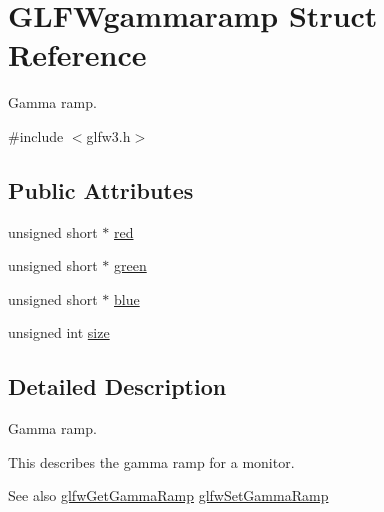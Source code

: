 \hypertarget{structGLFWgammaramp}{\section{\-G\-L\-F\-Wgammaramp \-Struct \-Reference}
\label{structGLFWgammaramp}
}


\-Gamma ramp.  




{\ttfamily \#include $<$glfw3.\-h$>$}

\subsection*{\-Public \-Attributes}
\begin{DoxyCompactItemize}
\item 
unsigned short $\ast$ \hyperlink{structGLFWgammaramp_a2cce5d968734b685623eef913e635138}{red}
\item 
unsigned short $\ast$ \hyperlink{structGLFWgammaramp_affccc6f5df47820b6562d709da3a5a3a}{green}
\item 
unsigned short $\ast$ \hyperlink{structGLFWgammaramp_acf0c836d0efe29c392fe8d1a1042744b}{blue}
\item 
unsigned int \hyperlink{structGLFWgammaramp_ad620e1cffbff9a32c51bca46301b59a5}{size}
\end{DoxyCompactItemize}


\subsection{\-Detailed \-Description}
\-Gamma ramp. 

\-This describes the gamma ramp for a monitor.

\begin{DoxySeeAlso}{\-See also}
\hyperlink{group__monitor_gaeeac9198f3c91b83440eed679441f76b}{glfw\-Get\-Gamma\-Ramp} \hyperlink{group__monitor_gac9f36a1cfa10eab191d3029ea8bc9558}{glfw\-Set\-Gamma\-Ramp} 
\end{DoxySeeAlso}


